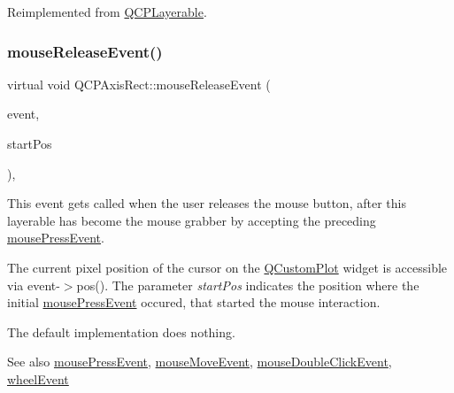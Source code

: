 Reimplemented from \hyperlink{class_q_c_p_layerable_af6567604818db90f4fd52822f8bc8376}{Q\+C\+P\+Layerable}.

\mbox{\label{class_q_c_p_axis_rect_ae4d536756ccd48928e8b3c475d8384b1}} 
\subsubsection{\texorpdfstring{mouse\+Release\+Event()}{mouseReleaseEvent()}\hspace{0.1cm}{\footnotesize\ttfamily [1/2]}}
{\footnotesize\ttfamily virtual void Q\+C\+P\+Axis\+Rect\+::mouse\+Release\+Event (\begin{DoxyParamCaption}\item[{Q\+Mouse\+Event $\ast$}]{event,  }\item[{const Q\+PointF \&}]{start\+Pos }\end{DoxyParamCaption})\hspace{0.3cm}{\ttfamily [protected]}, {\ttfamily [virtual]}}

This event gets called when the user releases the mouse button, after this layerable has become the mouse grabber by accepting the preceding \hyperlink{class_q_c_p_axis_rect_aa9a7c807eaa4666870ac94aa6abc4dde}{mouse\+Press\+Event}.

The current pixel position of the cursor on the \hyperlink{class_q_custom_plot}{Q\+Custom\+Plot} widget is accessible via {\ttfamily event-\/$>$pos()}. The parameter {\itshape start\+Pos} indicates the position where the initial \hyperlink{class_q_c_p_axis_rect_aa9a7c807eaa4666870ac94aa6abc4dde}{mouse\+Press\+Event} occured, that started the mouse interaction.

The default implementation does nothing.

\begin{DoxySeeAlso}{See also}
\hyperlink{class_q_c_p_axis_rect_aa9a7c807eaa4666870ac94aa6abc4dde}{mouse\+Press\+Event}, \hyperlink{class_q_c_p_axis_rect_a9cd27ad8c5cfb49aefd9dbb30def4beb}{mouse\+Move\+Event}, \hyperlink{class_q_c_p_layerable_a4171e2e823aca242dd0279f00ed2de81}{mouse\+Double\+Click\+Event}, \hyperlink{class_q_c_p_axis_rect_a93eeaa0c127d6d6fe8171b2455080262}{wheel\+Event} 
\end{DoxySeeAlso}


